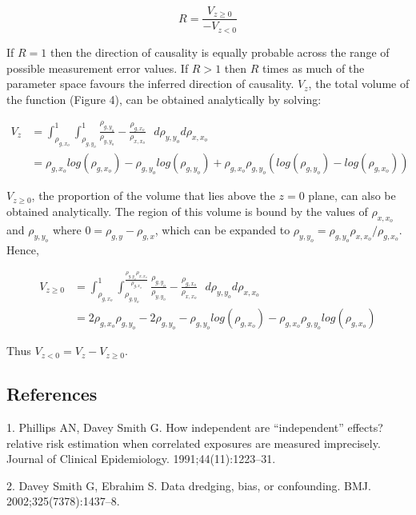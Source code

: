 \documentclass[]{article}
\begin{document}
\[
R = \frac{V_{z \geq 0}}{ - V_{z < 0} }
\]

If \(R=1\) then the direction of causality is equally probable across
the range of possible measurement error values. If \(R > 1\) then \(R\)
times as much of the parameter space favours the inferred direction of
causality. \(V_{z}\), the total volume of the function (Figure 4), can
be obtained analytically by solving:

\[
\begin{aligned}
V_z & = \int^1_{\rho_{g,x_o}} \int^1_{\rho_{g,y_o}} \frac{\rho_{g,y_o}}{\rho_{y,y_o}} - \frac{\rho_{g,x_o}}{\rho_{x,x_o}}\,\,\,\, d\rho_{y,y_o}d\rho_{x,x_o} \\
& = \rho_{g,x_o}log(\rho_{g,x_o}) - \rho_{g,y_o}log(\rho_{g,y_o}) + \rho_{g,x_o}\rho_{g,y_o}(log(\rho_{g,y_o})-log(\rho_{g,x_o}))
\end{aligned}
\]

\(V_{z \ge 0}\), the proportion of the volume that lies above the
\(z=0\) plane, can also be obtained analytically. The region of this
volume is bound by the values of \(\rho_{x,x_o}\) and \(\rho_{y,y_o}\)
where \(0 = \rho_{g,y} - \rho_{g,x}\), which can be expanded to
\(\rho_{y,y_o} = \rho_{g,y_o}\rho_{x,x_o} / \rho_{g,x_o}\). Hence,

\[
\begin{aligned}
V_{z \ge 0} & = \int^1_{\rho_{g,x_o}} \int^{\frac{\rho_{g,y_o}\rho_{x,x_o}}{\rho_{g,x_o}}}_{\rho_{g,y_o}} \frac{\rho_{g,y_o}}{\rho_{y,y_o}} - \frac{\rho_{g,x_o}}{\rho_{x,x_o}}\,\,\,\, d\rho_{y,y_o}d\rho_{x,x_o} \\
& = 2\rho_{g,x_o}\rho_{g,y_o} - 2\rho_{g,y_o} - \rho_{g,y_o}log(\rho_{g,x_o}) - \rho_{g,x_o}\rho_{g,y_o}log(\rho_{g,x_o})
\end{aligned}
\]

Thus \(V_{z < 0} = V_{z} - V_{z \geq 0}\).

\newpage

\subsection{References}\label{references}

\raggedright

\hypertarget{refs}{}
\hypertarget{ref-Phillips1991}{}
1. Phillips AN, Davey Smith G. How independent are ``independent''
effects? relative risk estimation when correlated exposures are measured
imprecisely. Journal of Clinical Epidemiology. 1991;44(11):1223--31.

\hypertarget{ref-DaveySmith2002}{}
2. Davey Smith G, Ebrahim S. Data dredging, bias, or confounding. BMJ.
2002;325(7378):1437--8.
\end{document}
